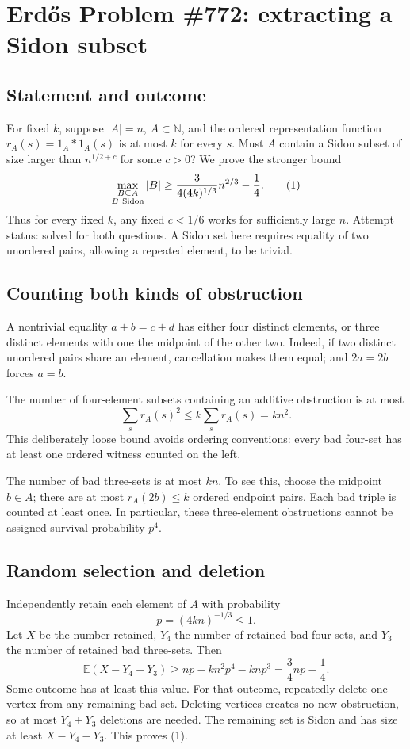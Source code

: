 \section*{Erd\H{o}s Problem \#772: extracting a Sidon subset}
\subsection*{Statement and outcome}
For fixed \(k\), suppose \(|A|=n\), \(A\subset\mathbb N\), and the ordered representation function \(r_A(s)=1_A*1_A(s)\) is at most \(k\) for every \(s\). Must \(A\) contain a Sidon subset of size larger than \(n^{1/2+c}\) for some \(c>0\)?
We prove the stronger bound
\[
\max_{\substack{B\subseteq A\\B\ {\rm Sidon}}}|B|
\geq \frac{3}{4(4k)^{1/3}}n^{2/3}-\frac14. \tag{1}
\]
Thus for every fixed \(k\), any fixed \(c<1/6\) works for sufficiently large \(n\). Attempt status: solved for both questions. A Sidon set here requires equality of two unordered pairs, allowing a repeated element, to be trivial.

\subsection*{Counting both kinds of obstruction}
A nontrivial equality \(a+b=c+d\) has either four distinct elements, or three distinct elements with one the midpoint of the other two. Indeed, if two distinct unordered pairs share an element, cancellation makes them equal; and \(2a=2b\) forces \(a=b\).

The number of four-element subsets containing an additive obstruction is at most
\[
\sum_s r_A(s)^2\leq k\sum_s r_A(s)=kn^2. \tag{2}
\]
This deliberately loose bound avoids ordering conventions: every bad four-set has at least one ordered witness counted on the left.

The number of bad three-sets is at most \(kn\). To see this, choose the midpoint \(b\in A\); there are at most \(r_A(2b)\leq k\) ordered endpoint pairs. Each bad triple is counted at least once. In particular, these three-element obstructions cannot be assigned survival probability \(p^4\).

\subsection*{Random selection and deletion}
Independently retain each element of \(A\) with probability
\[
p=(4kn)^{-1/3}\leq1.
\]
Let \(X\) be the number retained, \(Y_4\) the number of retained bad four-sets, and \(Y_3\) the number of retained bad three-sets. Then
\[
\mathbb E(X-Y_4-Y_3)
\geq np-kn^2p^4-knp^3
=\frac34np-\frac14.
\]
Some outcome has at least this value. For that outcome, repeatedly delete one vertex from any remaining bad set. Deleting vertices creates no new obstruction, so at most \(Y_4+Y_3\) deletions are needed. The remaining set is Sidon and has size at least \(X-Y_4-Y_3\). This proves (1).


